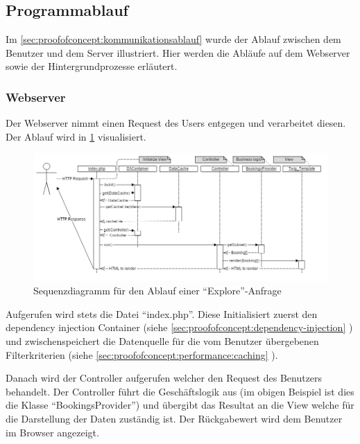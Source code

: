 \subsection{Programmablauf}
\label{sec:proofofconcept:programmablauf}
Im \cref{sec:proofofconcept:kommunikationsablauf} wurde der Ablauf zwischen dem Benutzer und dem Server illustriert. Hier werden die Abläufe auf dem Webserver sowie der Hintergrundprozesse erläutert.

\subsubsection{Webserver}
\label{sec:proofofconcept:architektur:webserver}
Der Webserver nimmt einen Request des Users entgegen und verarbeitet diesen. Der Ablauf wird in \cref{fig:proofofconcept:architektur:webserver:1} visualisiert.

\begin{figure}[H]
	\centering
	\includegraphics[width=1\textwidth]{images/diagram-sequence-controllers}
	\caption{Sequenzdiagramm für den Ablauf einer "`Explore"'-Anfrage}
	\label{fig:proofofconcept:architektur:webserver:1}
\end{figure}

Aufgerufen wird stets die Datei "`index.php"'. Diese Initialisiert zuerst den dependency injection Container (siehe \cref{sec:proofofconcept:dependency-injection} ) und zwischenspeichert die Datenquelle für die vom Benutzer übergebenen Filterkriterien (siehe \cref{sec:proofofconcept:performance:caching} ).

Danach wird der Controller aufgerufen welcher den Request des Benutzers behandelt. Der Controller führt die Geschäftslogik aus (im obigen Beispiel ist dies die Klasse "`BookingsProvider"') und übergibt das Resultat an die View welche für die Darstellung der Daten zuständig ist. Der Rückgabewert wird dem Benutzer im Browser angezeigt.

